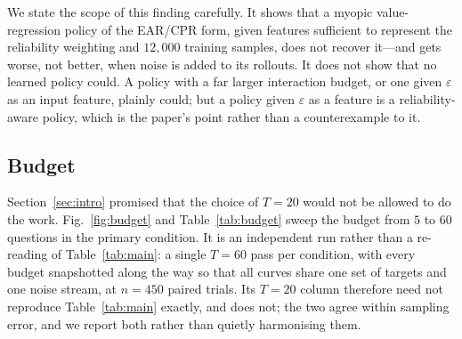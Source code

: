 We state the scope of this finding carefully. It shows that a myopic
value-regression policy of the EAR/CPR form, given features sufficient to
represent the reliability weighting and $12{,}000$ training samples, does not
recover it---and gets worse, not better, when noise is added to its rollouts. It
does not show that no learned policy could. A policy with a far larger
interaction budget, or one given $\varepsilon$ as an input feature, plainly
could; but a policy given $\varepsilon$ as a feature is a reliability-aware
policy, which is the paper's point rather than a counterexample to it.

\subsection{Budget}
\label{sec:results-budget}

Section~\ref{sec:intro} promised that the choice of $T=20$ would not be allowed
to do the work. Fig.~\ref{fig:budget} and Table~\ref{tab:budget} sweep the
budget from $5$ to $60$
questions in the primary condition. It is an independent run rather than a
re-reading of Table~\ref{tab:main}: a single $T=60$ pass per condition, with
every budget snapshotted along the way so that all curves share one set of
targets and one noise stream, at $n = 450$ paired trials. Its $T=20$ column
therefore need not reproduce Table~\ref{tab:main} exactly, and does not; the
two agree within sampling error, and we report both rather than quietly
harmonising them.

